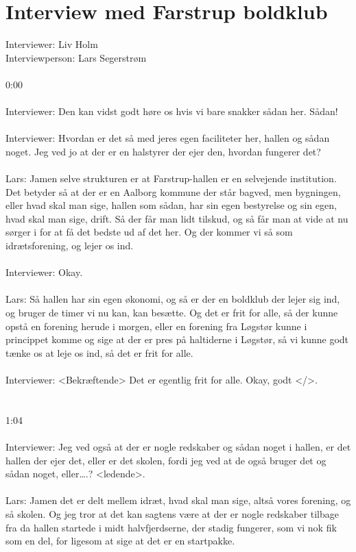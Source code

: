 \chapter{Interview med Farstrup boldklub}\label{ch:appBlabel}
Interviewer: Liv Holm\\
Interviewperson: Lars Segerstrøm
\\
\\
0:00
\\\\
Interviewer: Den kan vidst godt høre os hvis vi bare snakker sådan her. Sådan!
\\\\
Interviewer: Hvordan er det så med jeres egen faciliteter her, hallen og sådan noget. Jeg ved jo at der er en halstyrer der ejer den, hvordan fungerer det?
\\\\
Lars: Jamen selve strukturen er at Farstrup-hallen er en selvejende institution. Det betyder så at der er en Aalborg kommune der står bagved, men bygningen, eller hvad skal man sige, hallen som sådan, har sin egen bestyrelse og sin egen, hvad skal man sige, drift. Så der får man lidt tilskud, og så får man at vide at nu sørger i for at få det bedste ud af det her. Og der kommer vi så som idrætsforening, og lejer os ind.
\\\\
Interviewer: Okay.
\\\\
Lars: Så hallen har sin egen økonomi, og så er der en boldklub der lejer sig ind, og bruger de timer vi nu kan, kan besætte. Og det er frit for alle, så der kunne opstå en forening herude i morgen, eller en forening fra Løgstør kunne i princippet komme og sige at der er pres på haltiderne i Løgstør, så vi kunne godt tænke os at leje os ind, så det er frit for alle.
\\\\
Interviewer: <Bekræftende> Det er egentlig frit for alle. Okay, godt </>.
\\\\\\
1:04
\\\\
Interviewer: Jeg ved også at der er nogle redskaber og sådan noget i hallen, er det hallen der ejer det, eller er det skolen, fordi jeg ved at de også bruger det og sådan noget, eller….? <ledende>.
\\\\
Lars: Jamen det er delt mellem idræt, hvad skal man sige, altså vores forening, og så skolen. Og jeg tror at det kan sagtens være at der er nogle redskaber tilbage fra da hallen startede i midt halvfjerdserne, der stadig fungerer, som vi nok fik som en del, for ligesom at sige at det er en startpakke.
